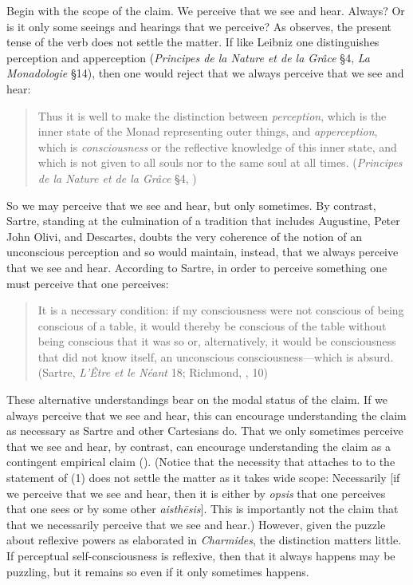 Begin with the scope of the claim. We perceive that we see and hear. Always? Or is it only some seeings and hearings that we perceive? As \citet[]{McCabe:2007jb} observes, the present tense of the verb does not settle the matter. If like Leibniz one distinguishes perception and apperception (\emph{Principes de la Nature et de la Grâce} §4, \emph{La Monadologie} §14), then one would reject that we always perceive that we see and hear:
\begin{quote}
	Thus it is well to make the distinction between \emph{perception}, which is the inner state of the Monad representing outer things, and \emph{apperception}, which is \emph{consciousness} or the reflective knowledge of this inner state, and which is not given to all souls nor to the same soul at all times. (\emph{Principes de la Nature et de la Grâce} §4, \citealt[411]{Latta:1898aa})
\end{quote}
So we may perceive that we see and hear, but only sometimes. By contrast, Sartre, standing at the culmination of a tradition that includes Augustine, Peter John Olivi, and Descartes, doubts the very coherence of the notion of an unconscious perception and so would maintain, instead, that we always perceive that we see and hear. According to Sartre, in order to perceive something one must perceive that one perceives: 
\begin{quote}
	It is a necessary condition: if my consciousness were not conscious of being conscious of a table, it would thereby be conscious of the table without being conscious that it was so or, alternatively, it would be consciousness that did not know itself, an unconscious consciousness—which is absurd. (Sartre, \emph{L'Être et le Néant} 18; Richmond, \citeyear{Sartre:2018aa}, 10)
\end{quote}
These alternative understandings bear on the modal status of the claim. If we always perceive that we see and hear, this can encourage understanding the claim as necessary as Sartre and other Cartesians do. That we only sometimes perceive that we see and hear, by contrast, can encourage understanding the claim as a contingent empirical claim (\citealt[401]{Osborne:1983le}). (Notice that the necessity that attaches to to the statement of (1) does not settle the matter as it takes wide scope: Necessarily [if we perceive that we see and hear, then it is either by \emph{opsis} that one perceives that one sees or by some other \emph{aisthēsis}]. This is importantly not the claim that that we necessarily perceive that we see and hear.) However, given the puzzle about reflexive powers as elaborated in \emph{Charmides}, the distinction matters little. If perceptual self-consciousness is reflexive, then that it always happens may be puzzling, but it remains so even if it only sometimes happens.

